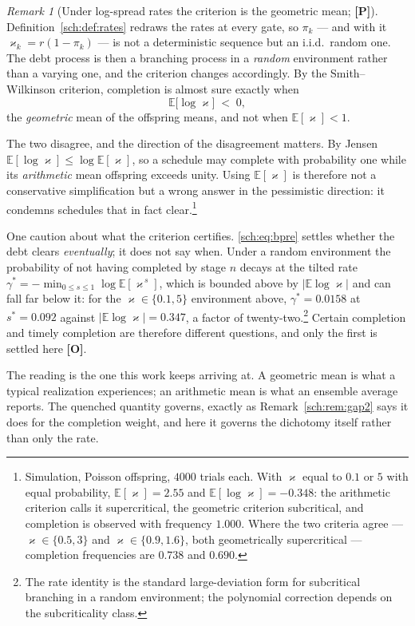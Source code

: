 \documentclass[11pt]{article}
\numberwithin{equation}{section}
\theoremstyle{plain}
\theoremstyle{definition}
\theoremstyle{remark}
\newtheorem{remark}[theorem]{Remark}
\newcommand{\E}{\mathbb{E}}
\begin{document}
\begin{remark}[Under log-spread rates the criterion is the geometric
mean; \textbf{[P]}]\label{sch:rem:bpre}
Definition~\ref{sch:def:rates} redraws the rates at every gate, so
$\pi_k$ --- and with it $\varkappa_k=r(1-\pi_k)$ --- is not a deterministic
sequence but an i.i.d.\ random one. The debt process is then a branching
process in a \emph{random} environment rather than a varying one, and the
criterion changes accordingly. By the Smith--Wilkinson criterion,
completion is almost sure exactly when
\begin{equation}\label{sch:eq:bpre}
\E\bigl[\log \varkappa\bigr]\;<\;0,
\end{equation}
the \emph{geometric} mean of the offspring means, and not when
$\E[\varkappa]<1$.

The two disagree, and the direction of the disagreement matters. By
Jensen $\E[\log \varkappa]\le\log\E[\varkappa]$, so a schedule may complete with
probability one while its \emph{arithmetic} mean offspring exceeds
unity. Using $\E[\varkappa]$ is therefore not a conservative simplification but
a wrong answer in the pessimistic direction: it condemns schedules that
in fact clear.\footnote{Simulation, Poisson offspring, $4000$ trials
each. With $\varkappa$ equal to $0.1$ or $5$ with equal probability,
$\E[\varkappa]=2.55$ and $\E[\log \varkappa]=-0.348$: the arithmetic criterion calls it
supercritical, the geometric criterion subcritical, and completion is
observed with frequency $1.000$. Where the two criteria agree ---
$\varkappa\in\{0.5,3\}$ and $\varkappa\in\{0.9,1.6\}$, both geometrically supercritical
--- completion frequencies are $0.738$ and $0.690$.}

One caution about what the criterion certifies. \eqref{sch:eq:bpre}
settles whether the debt clears \emph{eventually}; it does not say when.
Under a random environment the probability of not having completed by
stage $n$ decays at the tilted rate
$\gamma^\ast=-\min_{0\le s\le1}\log\E[\varkappa^{\,s}]$, which is bounded
above by $|\E\log\varkappa|$ and can fall far below it: for the
$\varkappa\in\{0.1,5\}$ environment above, $\gamma^\ast=0.0158$ at
$s^\ast=0.092$ against $|\E\log\varkappa|=0.347$, a factor of
twenty-two.\footnote{The rate identity is the standard large-deviation
form for subcritical branching in a random environment; the polynomial
correction depends on the subcriticality class.} Certain completion and
timely completion are therefore different questions, and only the first
is settled here \textbf{[O]}.

The reading is the one this work keeps arriving at. A geometric mean is
what a typical realization experiences; an arithmetic mean is what an
ensemble average reports. The quenched quantity governs, exactly as
Remark~\ref{sch:rem:gap2} says it does for the completion weight, and
here it governs the dichotomy itself rather than only the rate.
\end{remark}
\end{document}

